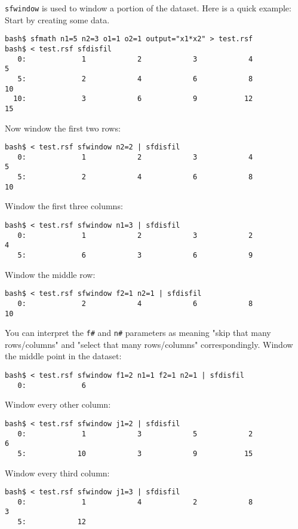 \texttt{sfwindow} is used to window a portion of the dataset. Here is
a quick example: Start by creating some data.
\begin{verbatim}
bash$ sfmath n1=5 n2=3 o1=1 o2=1 output="x1*x2" > test.rsf
bash$ < test.rsf sfdisfil
   0:             1            2            3            4            5
   5:             2            4            6            8           10
  10:             3            6            9           12           15
\end{verbatim}
Now window the first two rows:
\begin{verbatim}
bash$ < test.rsf sfwindow n2=2 | sfdisfil
   0:             1            2            3            4            5
   5:             2            4            6            8           10
\end{verbatim}
Window the first three columns:
\begin{verbatim}
bash$ < test.rsf sfwindow n1=3 | sfdisfil
   0:             1            2            3            2            4
   5:             6            3            6            9
\end{verbatim}
Window the middle row:
\begin{verbatim}
bash$ < test.rsf sfwindow f2=1 n2=1 | sfdisfil
   0:             2            4            6            8           10
\end{verbatim}
You can interpret the \texttt{f\#} and \texttt{n\#} parameters as
meaning "skip that many rows/columns" and "select that many
rows/columns" correspondingly. Window the middle point in the dataset:
\begin{verbatim}
bash$ < test.rsf sfwindow f1=2 n1=1 f2=1 n2=1 | sfdisfil
   0:             6
\end{verbatim}
Window every other column:
\begin{verbatim}
bash$ < test.rsf sfwindow j1=2 | sfdisfil
   0:             1            3            5            2            6
   5:            10            3            9           15
\end{verbatim}
Window every third column:
\begin{verbatim}
bash$ < test.rsf sfwindow j1=3 | sfdisfil
   0:             1            4            2            8            3
   5:            12
\end{verbatim}

